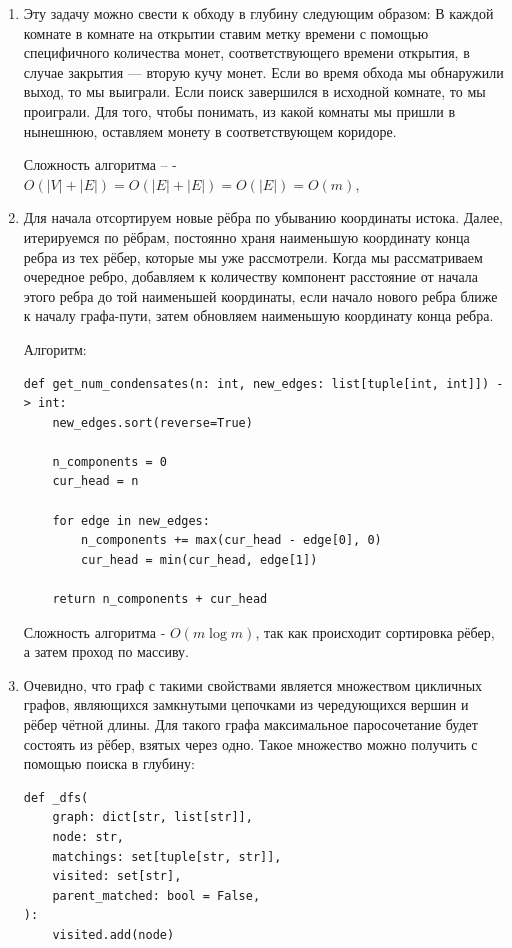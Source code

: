 \documentclass{article}
\begin{document}
\begin{enumerate}
\begin{enumerate}
	      \end{enumerate}

	\item Эту задачу можно свести к обходу в глубину
	      следующим образом:
	      В каждой комнате в комнате на открытии
	      ставим метку времени с помощью специфичного
	      количества монет, соответствующего времени
	      открытия, в случае закрытия --- вторую
	      кучу монет. Если во время обхода мы
	      обнаружили выход, то мы выиграли. Если
	      поиск завершился в исходной комнате, то
	      мы проиграли. Для того, чтобы понимать, из
	      какой комнаты мы пришли в нынешнюю, оставляем
	      монету в соответствующем коридоре.

	      Сложность алгоритма --	-
	      $O(\left| V \right| + \left| E \right|) =
		      O(\left| E \right| + \left| E \right|) =
		      O(\left| E \right|) = O(m)$,

	\item Для начала отсортируем новые рёбра по убыванию
	      координаты истока. Далее, итерируемся по рёбрам,
	      постоянно храня наименьшую координату конца ребра
	      из тех рёбер, которые мы уже рассмотрели.
	      Когда мы рассматриваем очередное ребро, добавляем
	      к количеству компонент расстояние от начала этого
	      ребра до той наименьшей координаты, если начало
	      нового ребра ближе к началу графа-пути, затем
	      обновляем наименьшую координату конца ребра.

	      Алгоритм:
	      \begin{lstlisting}
def get_num_condensates(n: int, new_edges: list[tuple[int, int]]) -> int:
	new_edges.sort(reverse=True)

	n_components = 0
	cur_head = n

	for edge in new_edges:
		n_components += max(cur_head - edge[0], 0)
		cur_head = min(cur_head, edge[1])

	return n_components + cur_head
		  \end{lstlisting}

	      Сложность алгоритма - $O(m \log m)$, так как
	      происходит сортировка рёбер, а затем проход по массиву.

	\item Очевидно, что граф с такими свойствами является
	      множеством цикличных графов, являющихся замкнутыми цепочками
	      из чередующихся вершин и рёбер чётной длины. Для такого графа
	      максимальное паросочетание будет состоять из рёбер,
	      взятых через одно. Такое множество можно получить с
	      помощью поиска в глубину:
	      \begin{lstlisting}
def _dfs(
    graph: dict[str, list[str]],
    node: str,
    matchings: set[tuple[str, str]],
    visited: set[str],
    parent_matched: bool = False,
):
    visited.add(node)


\end{lstlisting}
\end{enumerate}
\end{document}
